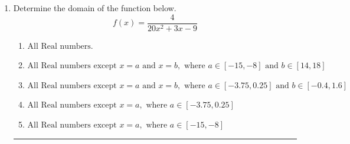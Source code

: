 \documentclass[14pt]{extbook}
\newcommand{\litem}[1]{\item#1\hspace*{-1cm}\rule{\textwidth}{0.4pt}}
\begin{document}
\begin{enumerate}
\litem{
Determine the domain of the function below.\[ f(x) = \frac{4}{20x^{2} +3 x -9} \]\begin{enumerate}[label=\Alph*.]
\item \( \text{All Real numbers.} \)
\item \( \text{All Real numbers except } x = a \text{ and } x = b, \text{ where } a \in [-15, -8] \text{ and } b \in [14, 18] \)
\item \( \text{All Real numbers except } x = a \text{ and } x = b, \text{ where } a \in [-3.75, 0.25] \text{ and } b \in [-0.4, 1.6] \)
\item \( \text{All Real numbers except } x = a, \text{ where } a \in [-3.75, 0.25] \)
\item \( \text{All Real numbers except } x = a, \text{ where } a \in [-15, -8] \)


\end{enumerate}}
\end{enumerate}
\end{document}
